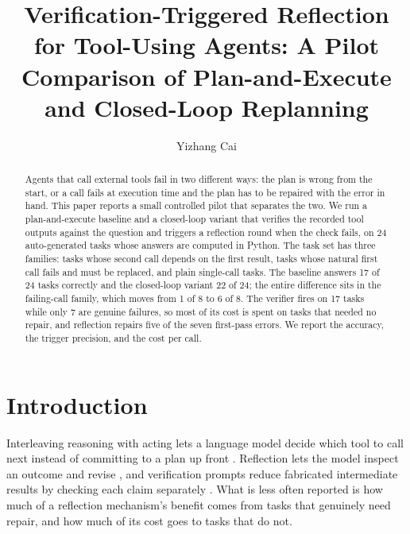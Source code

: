 \documentclass[runningheads,a4paper]{llncs}
\begin{document}
\title{Verification-Triggered Reflection for Tool-Using Agents: A Pilot Comparison of Plan-and-Execute and Closed-Loop Replanning}


\author{Yizhang Cai}



\maketitle

\begin{abstract}

Agents that call external tools fail in two different ways: the plan is wrong from the start, or a call fails at execution time and the plan has to be repaired with the error in hand. This paper reports a small controlled pilot that separates the two. We run a plan-and-execute baseline and a closed-loop variant that verifies the recorded tool outputs against the question and triggers a reflection round when the check fails, on 24 auto-generated tasks whose answers are computed in Python. The task set has three families: tasks whose second call depends on the first result, tasks whose natural first call fails and must be replaced, and plain single-call tasks. The baseline answers 17 of 24 tasks correctly and the closed-loop variant 22 of 24; the entire difference sits in the failing-call family, which moves from 1 of 8 to 6 of 8. The verifier fires on 17 tasks while only 7 are genuine failures, so most of its cost is spent on tasks that needed no repair, and reflection repairs five of the seven first-pass errors. We report the accuracy, the trigger precision, and the cost per call.


\end{abstract}

\section{Introduction}

Interleaving reasoning with acting lets a language model decide which tool to call next instead of committing to a plan up front \cite{camel2025}. Reflection lets the model inspect an outcome and revise \cite{acps2026repo,conformal2021}, and verification prompts reduce fabricated intermediate results by checking each claim separately \cite{debenedetti2024agentdojo}. What is less often reported is how much of a reflection mechanism's benefit comes from tasks that genuinely need repair, and how much of its cost goes to tasks that do not.
\end{document}
